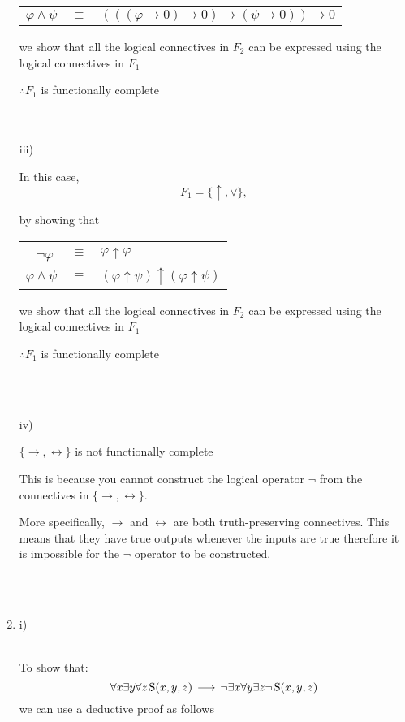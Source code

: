 \documentclass{article}
\newcommand{\predS}{\hspace{0.05cm} \textnormal{S}}
\newcommand{\predicate}{\predS (x,y,z)}
\newcommand{\impgap}{\hspace{0.05cm}}
\newcommand{\imp}{\impgap \longrightarrow \impgap}
\begin{document}
\begin{enumerate}
{\begin{center}
\begin{tabular}{ccl}
    $\varphi \land \psi$ & $\equiv$ & $(((\varphi \rightarrow 0) \rightarrow 0) \rightarrow (\psi \rightarrow 0)) \rightarrow 0$
    \end{tabular}\end{center}
    we show that all the logical connectives in $F_2$ can be expressed using the logical connectives in $F_1$ 
    
    $\therefore F_1$ is functionally complete
    } \\ \\

    iii) \\
    {
    In this case,
    $$F_1 = \{\uparrow, \lor\},$$

    by showing that

    \begin{center}\begin{tabular}{ccl}\
    $\lnot \varphi$ & $\equiv$ & $\varphi \uparrow \varphi$ \\
    
    $\varphi \land \psi$ & $\equiv$ & $(\varphi \uparrow \psi) \uparrow (\varphi \uparrow \psi)$
    \end{tabular}\end{center}
    we show that all the logical connectives in $F_2$ can be expressed using the logical connectives in $F_1$
    
    $\therefore F_1$ is functionally complete
    } \\ \\

    \pagebreak

    iv)
    {
    \begin{center}
    $\{\rightarrow, \longleftrightarrow\}$ is not functionally complete
    \end{center}
   
    This is because you cannot construct the logical operator $\lnot$ from the connectives in $\{\rightarrow, \longleftrightarrow\}$.
   
    More specifically, $\rightarrow$ and $\longleftrightarrow$ are both truth-preserving connectives. This means that they have true outputs whenever the inputs are true therefore it is impossible for the $\lnot$ operator to be constructed.
    } \\ \\

    \pagebreak

    \item
    i) \\ \\
    {
    To show that:
    $$\forall x \exists y \forall z \predicate \imp \lnot\exists x \forall y \exists z \lnot \predicate$$
    we can use a deductive proof as follows
    
}
\end{enumerate}
\end{document}
